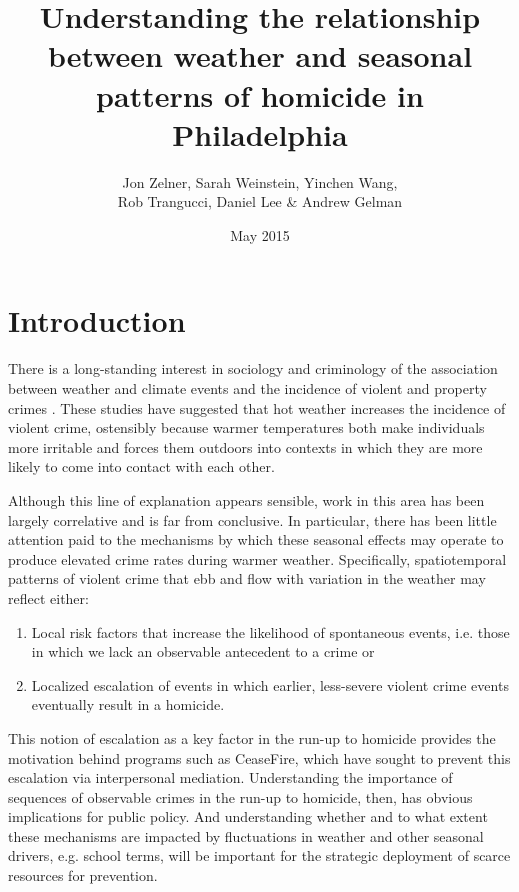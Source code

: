 \documentclass{article}\usepackage[]{graphicx}\usepackage[]{color}
\begin{document}
\title{Understanding the relationship between weather and seasonal patterns of homicide in Philadelphia}
\author{Jon Zelner, Sarah Weinstein, Yinchen Wang, \\ Rob Trangucci, Daniel Lee \& Andrew Gelman}

\date{May 2015}
\maketitle

\section{Introduction}

There is a long-standing interest in sociology and criminology of the association between weather and climate events and the incidence of violent and property crimes \cite{Anderson:1997ve,Sorg:2011ex}. These studies have suggested that hot weather increases the incidence of violent crime, ostensibly because warmer temperatures both make individuals more irritable and forces them outdoors into contexts in which they are more likely to come into contact with each other.

Although this line of explanation appears sensible, work in this area has been largely correlative and is far from conclusive. In particular, there has been little attention paid to the mechanisms by which these seasonal effects may operate to produce elevated crime rates during warmer weather. Specifically, spatiotemporal patterns of violent crime that ebb and flow with variation in the weather may reflect either:

\begin{enumerate}
\item  Local risk factors that increase the likelihood of spontaneous events, i.e. those in which we lack an observable antecedent to a crime or
\item  Localized escalation of events in which earlier, less-severe violent crime events eventually result in a homicide.
\end{enumerate}

This notion of escalation as a key factor in the run-up to homicide provides the motivation behind programs such as CeaseFire, which have sought to prevent this escalation via interpersonal mediation. Understanding the importance of sequences of observable crimes in the run-up to homicide, then, has obvious implications for public policy. And understanding whether and to what extent these mechanisms are impacted by fluctuations in weather and other seasonal drivers, e.g. school terms, will be important for the strategic deployment of scarce resources for prevention.
\end{document}
